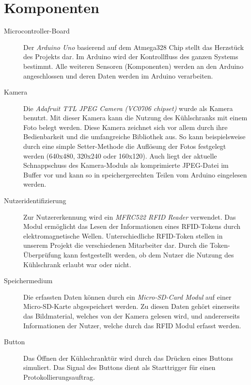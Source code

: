 \documentclass[a4paper, 11pt]{article}
\begin{document}
\section{Komponenten}
\begin{description}
\item [Microcontroller-Board] Der \textit{Arduino Uno} basierend auf dem Atmega328 Chip stellt das Herzstück des Projekts dar. Im Arduino wird der Kontrollfluss des ganzen Systems bestimmt. Alle weiteren Sensoren (Komponenten) werden an den Arduino angeschlossen und deren Daten werden im Arduino verarbeiten.
\item [Kamera] Die \textit{Adafruit TTL JPEG Camera (VC0706 chipset)} wurde als Kamera benutzt. Mit dieser Kamera kann die Nutzung des Kühlschranks mit einem Foto belegt werden. Diese Kamera zeichnet sich vor allem durch ihre Bedienbarkeit und die umfangreiche Bibliothek aus. So kann beispielsweise durch eine simple Setter-Methode die Auflösung der Fotos festgelegt werden (640x480, 320x240 oder 160x120). Auch liegt der aktuelle Schnappschuss des Kamera-Moduls als komprimierte JPEG-Datei im Buffer vor und kann so in speichergerechten Teilen vom Arduino eingelesen werden.
\item [Nutzeridentifizierung] Zur Nutzererkennung wird ein \textit{MFRC522 RFID Reader} verwendet. Das Modul ermöglicht das Lesen der Informationen eines RFID-Tokens durch elektromagnetische Wellen. Unterschiedliche RFID-Token stellen in unserem Projekt die verschiedenen Mitarbeiter dar. Durch die Token-Überprüfung kann festgestellt werden, ob dem Nutzer die Nutzung des Kühlschrank erlaubt war oder nicht. 
\item [Speichermedium] Die erfassten Daten können durch ein \textit{Micro-SD-Card Modul} auf einer Micro-SD-Karte abgespeichert werden. Zu diesen Daten gehört einerseits das Bildmaterial, welches von der Kamera gelesen wird, und andererseits Informationen der Nutzer, welche durch das RFID Modul erfasst werden.
\item [Button] Das Öffnen der Kühlschranktür wird durch das Drücken eines Buttons simuliert. Das Signal des Buttons dient als Starttrigger für einen Protokollierungsauftrag.
\end{description}
\end{document}
